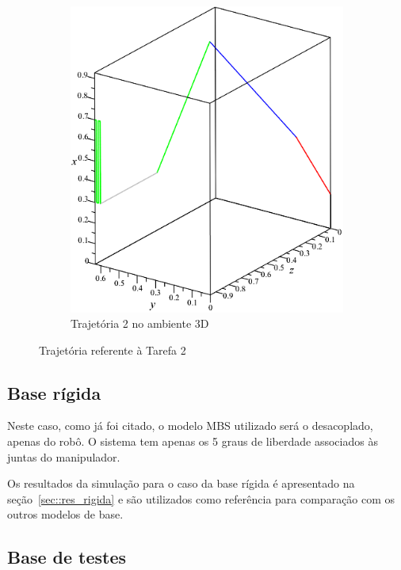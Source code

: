 \begin{figure}[h!]
\begin{subfigure}[b]{0.45\textwidth}
        \includegraphics[width=\textwidth]{figs/traj2_3d}
        \caption{Trajetória 2 no ambiente 3D}
        \label{fig::traj2_3d}
    \end{subfigure}
    \caption{Trajetória referente à Tarefa 2}
    \label{fig::traj2_subf}
\end{figure}


\subsection{Base rígida}

Neste caso, como já foi citado, o modelo MBS utilizado será o desacoplado,
apenas do robô. O sistema tem apenas os 5 graus de liberdade associados às juntas do
manipulador.

Os resultados da simulação para o caso da base rígida é apresentado na
seção~\ref{sec::res_rigida} e são utilizados como referência para comparação
com os outros modelos de base.


\subsection{Base de testes} \label{sec::base_testes}


